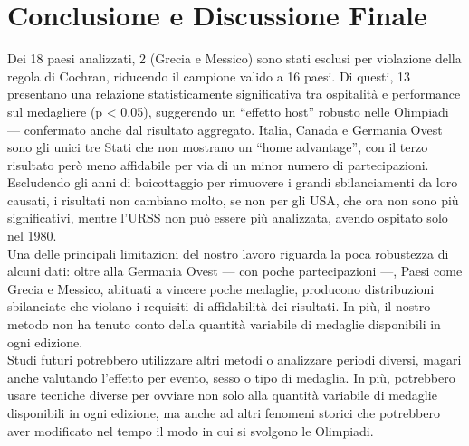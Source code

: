 \section{Conclusione e Discussione Finale}\label{sec:conclusion}




Dei 18 paesi analizzati, 2 (Grecia e Messico) sono stati esclusi per violazione
della regola di Cochran, riducendo il campione valido a 16 paesi. Di questi, 13
presentano una relazione statisticamente significativa tra ospitalità e
performance sul medagliere (p < 0.05), suggerendo un ``effetto host'' robusto
nelle Olimpiadi --- confermato anche dal risultato aggregato. Italia, Canada e
Germania Ovest sono gli unici tre Stati che non mostrano un ``home advantage'',
con il terzo risultato però meno affidabile per via di un minor numero di
partecipazioni.\\
Escludendo gli anni di boicottaggio per rimuovere i grandi sbilanciamenti da
loro causati, i risultati non cambiano molto, se non per gli USA, che ora non
sono più significativi, mentre l'URSS non può essere più analizzata, avendo
ospitato solo nel 1980.\\
Una delle principali limitazioni del nostro lavoro riguarda la poca robustezza
di alcuni dati: oltre alla Germania Ovest --- con poche partecipazioni ---,
Paesi come Grecia e Messico, abituati a vincere poche medaglie, producono
distribuzioni sbilanciate che violano i requisiti di affidabilità dei risultati.
In più, il nostro metodo non ha tenuto conto della quantità variabile di
medaglie disponibili in ogni edizione.\\
Studi futuri potrebbero utilizzare altri metodi o analizzare periodi diversi,
magari anche valutando l'effetto per evento, sesso o tipo di medaglia. In più,
potrebbero usare tecniche diverse per ovviare non solo alla quantità variabile
di medaglie disponibili in ogni edizione, ma anche ad altri fenomeni storici che
potrebbero aver modificato nel tempo il modo in cui si svolgono le Olimpiadi.
